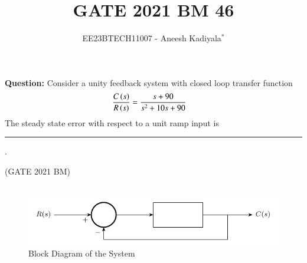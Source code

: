 \documentclass[journal,12pt,twocolumn]{IEEEtran}
\theoremstyle{remark}
\begin{document}

\vspace{3cm}

\title{GATE 2021 BM 46}
\author{EE23BTECH11007 - Aneesh Kadiyala$^{*}$%
}
\maketitle
\newpage
\bigskip

\renewcommand{\thefigure}{\theenumi}
\renewcommand{\thetable}{\theenumi}

\vspace{3cm}
\textbf{Question:} Consider a unity feedback system with closed loop transfer function
\begin{align*}
\frac{C\left(s\right)}{R\left(s\right)} &= \frac{s + 90}{s^2 + 10s + 90}
\end{align*}
The steady state error with respect to a unit ramp input is \rule{1cm}{0.15mm} . 

\hfill(GATE 2021 BM)
\\
\solution
\\
\begin{figure}[h!]
\centering
\includegraphics{figs/block-diagram.pdf}
\caption{Block Diagram of the System}
\label{fig:2021bm46-1}
\end{figure}
\end{document}
